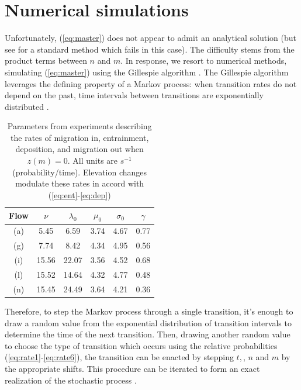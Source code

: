 \documentclass[draft]{agujournal2018}
\begin{document}
\section{Numerical simulations}

Unfortunately, (\ref{eq:master}) does not appear to admit an analytical solution (but see \citet{Swift2002} for a standard method which fails in this case).
The difficulty stems from the product terms between $n$ and $m$.
In response, we resort to numerical methods, simulating (\ref{eq:master}) using the Gillespie algorithm \citep{Gillespie1977, Gillespie1992, Gillespie2007}.
The Gillespie algorithm leverages the defining property of a Markov process: when transition rates do not depend on the past, time intervals between transitions are exponentially distributed \citep[e.g.][]{Cox1965}.



\begin{table}
	\caption{Parameters from \citet{Ancey2008} experiments describing the rates of migration in, entrainment, deposition, and migration out when $z(m)=0$. All units are $s^{-1}$ (probability/time). Elevation changes modulate these rates in accord with (\ref{eq:ent}-\ref{eq:dep})}\label{tab:anceyparams}
	\begin{tabular}{cccccc} \\ 
		\toprule  
		Flow & $\nu$ & $\lambda_0$ & $\mu_0$ & $\sigma_0$ & $\gamma$ \\
		\midrule
		(a) & 5.45  & 6.59  & 3.74 & 4.67 & 0.77 \\
		\midrule
		(g) & 7.74  & 8.42  & 4.34 & 4.95 & 0.56 \\
		\midrule
		(i) & 15.56 & 22.07 & 3.56 & 4.52 & 0.68 \\
		\midrule
		(l) & 15.52 & 14.64 & 4.32 & 4.77 & 0.48 \\
		\midrule
		(n) & 15.45 & 24.49 & 3.64 & 4.21 & 0.36 \\
		\bottomrule
	\end{tabular}
\end{table} 

Therefore, to step the Markov process through a single transition, it's enough to draw a random value from the exponential distribution of transition intervals to determine the time of the next transition.
Then, drawing another random value to choose the type of transition which occurs using the relative probabilities (\ref{eq:rate1}-\ref{eq:rate6}), the transition can be enacted by stepping $t,$, $n$ and $m$ by the appropriate shifts.
This procedure can be iterated to form an exact realization of the stochastic process \citep[e.g.][]{Gillespie2007}.
\end{document}
